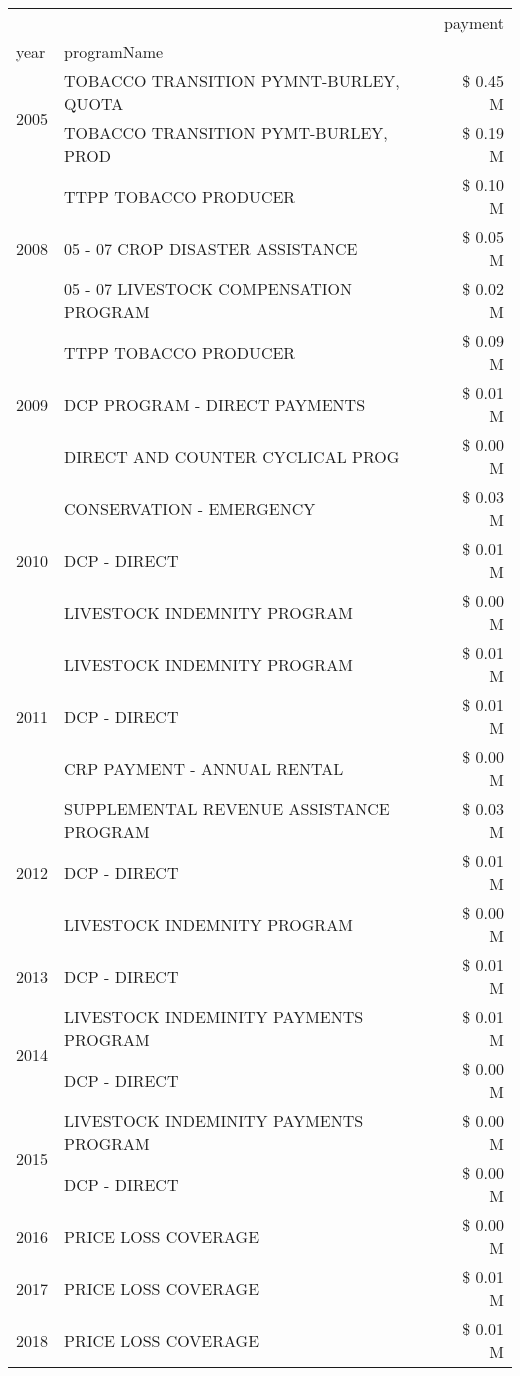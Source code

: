 \begin{tabular}{llr}
\toprule
 &  & payment \\
year & programName &  \\
\midrule
\multirow[t]{2}{*}{2005} & TOBACCO TRANSITION PYMNT-BURLEY, QUOTA & \$ 0.45 M \\
 & TOBACCO TRANSITION PYMT-BURLEY, PROD & \$ 0.19 M \\
\cline{1-3}
\multirow[t]{3}{*}{2008} & TTPP TOBACCO PRODUCER & \$ 0.10 M \\
 & 05 - 07 CROP DISASTER ASSISTANCE & \$ 0.05 M \\
 & 05 - 07 LIVESTOCK COMPENSATION PROGRAM & \$ 0.02 M \\
\cline{1-3}
\multirow[t]{3}{*}{2009} & TTPP TOBACCO PRODUCER & \$ 0.09 M \\
 & DCP PROGRAM - DIRECT PAYMENTS & \$ 0.01 M \\
 & DIRECT AND COUNTER CYCLICAL PROG & \$ 0.00 M \\
\cline{1-3}
\multirow[t]{3}{*}{2010} & CONSERVATION - EMERGENCY & \$ 0.03 M \\
 & DCP - DIRECT & \$ 0.01 M \\
 & LIVESTOCK INDEMNITY PROGRAM & \$ 0.00 M \\
\cline{1-3}
\multirow[t]{3}{*}{2011} & LIVESTOCK INDEMNITY PROGRAM & \$ 0.01 M \\
 & DCP - DIRECT & \$ 0.01 M \\
 & CRP PAYMENT - ANNUAL RENTAL & \$ 0.00 M \\
\cline{1-3}
\multirow[t]{3}{*}{2012} & SUPPLEMENTAL REVENUE ASSISTANCE PROGRAM & \$ 0.03 M \\
 & DCP - DIRECT & \$ 0.01 M \\
 & LIVESTOCK INDEMNITY PROGRAM & \$ 0.00 M \\
\cline{1-3}
2013 & DCP - DIRECT & \$ 0.01 M \\
\cline{1-3}
\multirow[t]{2}{*}{2014} & LIVESTOCK INDEMINITY PAYMENTS PROGRAM & \$ 0.01 M \\
 & DCP - DIRECT & \$ 0.00 M \\
\cline{1-3}
\multirow[t]{2}{*}{2015} & LIVESTOCK INDEMINITY PAYMENTS PROGRAM & \$ 0.00 M \\
 & DCP - DIRECT & \$ 0.00 M \\
\cline{1-3}
2016 & PRICE LOSS COVERAGE & \$ 0.00 M \\
\cline{1-3}
2017 & PRICE LOSS COVERAGE & \$ 0.01 M \\
\cline{1-3}
2018 & PRICE LOSS COVERAGE & \$ 0.01 M \\

\end{tabular}
